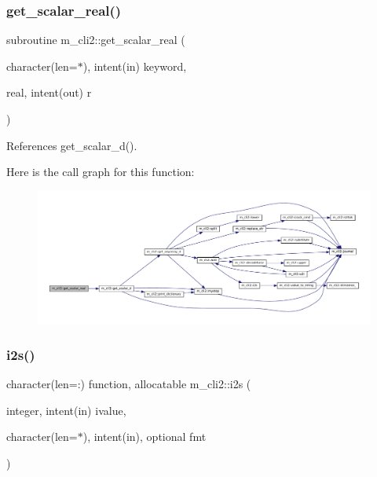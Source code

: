 \subsubsection{\texorpdfstring{get\+\_\+scalar\+\_\+real()}{get\_scalar\_real()}}
{\footnotesize\ttfamily subroutine m\+\_\+cli2\+::get\+\_\+scalar\+\_\+real (\begin{DoxyParamCaption}\item[{character(len=$\ast$), intent(in)}]{keyword,  }\item[{real, intent(out)}]{r }\end{DoxyParamCaption})\hspace{0.3cm}{\ttfamily [private]}}



References get\+\_\+scalar\+\_\+d().

Here is the call graph for this function\+:
\nopagebreak
\begin{figure}[H]
\begin{center}
\leavevmode
\includegraphics[width=350pt]{namespacem__cli2_ad089d91c66626de91bcda84523e80b54_cgraph}
\end{center}
\end{figure}
\mbox{\label{namespacem__cli2_aa106d3533fd6d4845f0b3e94b2a79ffb}} 
\subsubsection{\texorpdfstring{i2s()}{i2s()}}
{\footnotesize\ttfamily character(len=\+:) function, allocatable m\+\_\+cli2\+::i2s (\begin{DoxyParamCaption}\item[{integer, intent(in)}]{ivalue,  }\item[{character(len=$\ast$), intent(in), optional}]{fmt }\end{DoxyParamCaption})\hspace{0.3cm}{\ttfamily [private]}}



